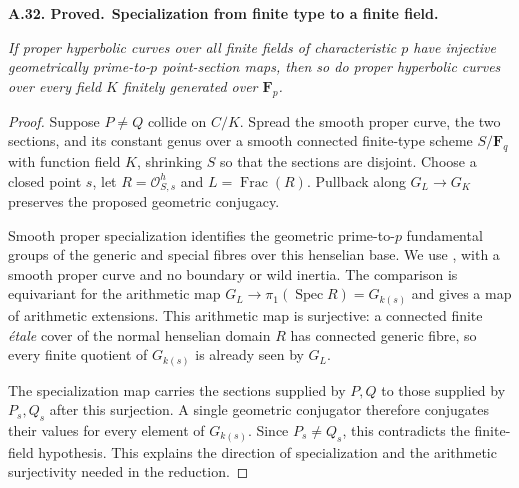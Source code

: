 \documentclass[11pt,a4paper]{article}
\newenvironment{claim}[3]{\par\medskip\noindent\hypertarget{#1}{\textbf{#1. #2.}}\ \textbf{#3.}\par\nopagebreak\smallskip\begingroup\itshape}{\endgroup\par\smallskip}
\begin{document}
\begin{claim}{A.32}{Proved}{Specialization from finite type to a finite field}
If proper hyperbolic curves over all finite fields of characteristic
$p$ have injective geometrically prime-to-$p$ point-section maps,
then so do proper hyperbolic curves over every field $K$ finitely
generated over $\mathbf F_p$.
\end{claim}
\begin{proof}
Suppose $P\ne Q$ collide on $C/K$. Spread the smooth proper curve,
the two sections, and its constant genus over a smooth connected
finite-type scheme $S/\mathbf F_q$ with function field $K$, shrinking
$S$ so that the sections are disjoint. Choose a closed point $s$,
let $R=\mathcal O^h_{S,s}$ and $L=\operatorname{Frac}(R)$. Pullback
along $G_L\to G_K$ preserves the proposed geometric conjugacy.

Smooth proper specialization identifies the geometric prime-to-$p$
fundamental groups of the generic and special fibres over this
henselian base. We use \cite[Expos\'e X, Corollary 3.9, and
Expos\'e XIII, Corollaries 2.9--2.10]{LA_SGA1}, with a smooth proper
curve and no boundary or wild inertia. The comparison is equivariant
for the arithmetic map
$G_L\to\pi_1(\operatorname{Spec}R)=G_{k(s)}$ and gives a map of
arithmetic extensions. This arithmetic map is surjective: a connected
finite \emph{\'etale} cover of the normal henselian domain $R$ has
connected generic fibre, so every finite quotient of $G_{k(s)}$
is already seen by $G_L$.

The specialization map carries the sections supplied by $P,Q$ to
those supplied by $P_s,Q_s$ after this surjection. A single geometric
conjugator therefore conjugates their values for every element of
$G_{k(s)}$. Since $P_s\ne Q_s$, this contradicts the finite-field
hypothesis. This explains the direction of specialization and the
arithmetic surjectivity needed in the reduction.
\end{proof}
\end{document}
